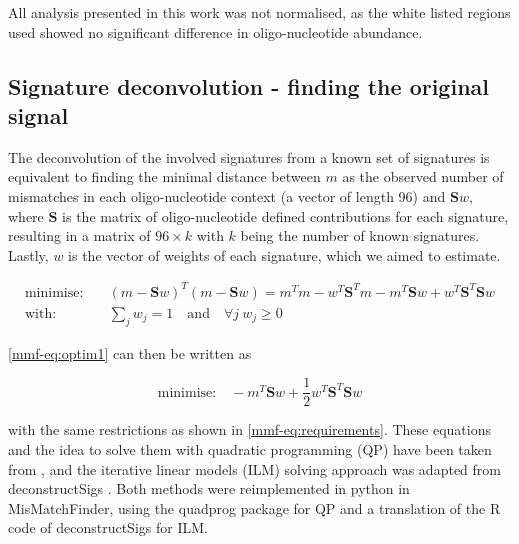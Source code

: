 All analysis presented in this work was not normalised, as the white listed regions used showed no significant difference in oligo-nucleotide abundance.

\subsection[Signature deconvolution]{Signature deconvolution - finding the original signal}
\label{mmf-sec:sigDeconv}
The deconvolution of the involved signatures from a known set of signatures is equivalent to finding the minimal distance between $m$ as the observed number of mismatches in each oligo-nucleotide context (a vector of length 96) and $\textbf{S}w$, where $\textbf{S}$ is the matrix of oligo-nucleotide defined contributions for each signature, resulting in a matrix of $96 \times k$ with $k$ being the number of known signatures. Lastly, $w$ is the vector of weights of each signature, which we aimed to estimate. 

\begin{align}
 \text{minimise:} & \quad (m - \textbf{S}w)^T(m - \textbf{S}w)
 = m^Tm - w^T\textbf{S}^Tm - m^T\textbf{S}w + w^T\textbf{S}^T\textbf{S}w \label{mmf-eq:optim1}\\
 \text{with:} & \quad \sum_j w_j = 1 \quad \text{and} \quad \boldsymbol{\forall} j ~ w_j \geq 0 \label{mmf-eq:requirements}
\end{align}
\myequation[\ref{mmf-eq:optim1}]{MisMatchFinder: optimisation for signature weights}
\myequation[\ref{mmf-eq:requirements}]{MisMatchFinder: optimisation function restrictions}

\autoref{mmf-eq:optim1} can then be written as 

\begin{equation}
\text{minimise:} \quad - m^T\textbf{S}w + \frac{1}{2}w^T\textbf{S}^T\textbf{S}w
\label{mmf-eq:optim2}
\end{equation}
\myequation[\ref{mmf-eq:optim2}]{MisMatchFinder: quadratic programming formula}

with the same restrictions as shown in \autoref{mmf-eq:requirements}. These equations and the idea to solve them with quadratic programming (QP) have been taken from \textcite{Lynch2016}, and the iterative linear models (ILM) solving approach was adapted from deconstructSigs \cite{Rosenthal2016}. Both methods were reimplemented in python in MisMatchFinder, using the quadprog package \cite{McGibbon2021} for QP and a translation of the R code of deconstructSigs for ILM.

